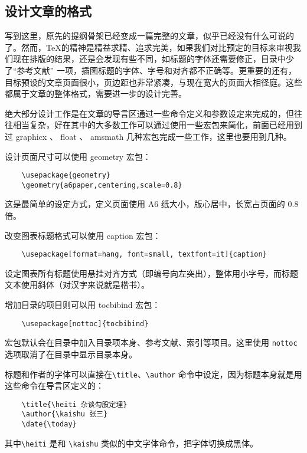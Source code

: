 \subsection{设计文章的格式}

写到这里，原先的提纲骨架已经变成一篇完整的文章，似乎已经没有什么可说的了。然而，\TeX 的精神是精益求精、追求完美，如果我们对比预定的目标来审视我们现在排版的结果，还是会发现有些不同，如标题的字体还需要修正，目录中少了“参考文献” 一项，插图标题的字体、字号和对齐都不正确等。更重要的还有，目标预设的文章页面很小，页边距也非常紧凑，与现在宽大的页面大相径庭。这些都属于文章的整体格式，需要进一步的设计完善。

绝大部分设计工作是在文章的导言区通过一些命令定义和参数设定来完成的，但往往相当复杂，好在其中的大多数工作可以通过使用一些宏包来简化，前面已经用到过 graphicx 、 float 、 amsmath 几种宏包完成一些工作，这里也要用到几种。

设计页面尺寸可以使用 geometry 宏包：
\begin{lstlisting}
    \usepackage{geometry}
    \geometry{a6paper,centering,scale=0.8}
\end{lstlisting}
这是最简单的设定方式，定义页面使用 A6 纸大小，版心居中，长宽占页面的 0.8 倍。

改变图表标题格式可以使用 caption 宏包：
\begin{lstlisting}
    \usepackage[format=hang, font=small, textfont=it]{caption}
\end{lstlisting}
设定图表所有标题使用悬挂对齐方式（即编号向左突出），整体用小字号，而标题文本使用斜体（对汉字来说就是楷书）。

增加目录的项目则可以用 tocbibind 宏包：
\begin{lstlisting}
    \usepackage[nottoc]{tocbibind}
\end{lstlisting}
宏包默认会在目录中加入目录项本身、参考文献、索引等项目。这里使用 \verb|nottoc| 选项取消了在目录中显示目录本身。

标题和作者的字体可以直接在\verb|\title|、\verb|\author| 命令中设定，因为标题本身就是用这些命令在导言区定义的：
\begin{lstlisting}
    \title{\heiti 杂谈勾股定理}
    \author{\kaishu 张三}
    \date{\today}
\end{lstlisting}
其中\verb|\heiti| 是和 \verb|\kaishu| 类似的中文字体命令，把字体切换成黑体。

